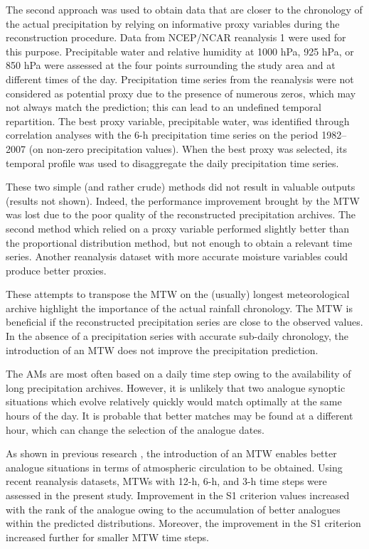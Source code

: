 \documentclass[hess, manuscript]{copernicus}
\begin{document}
	The second approach was used to obtain data that are closer to the chronology of the actual precipitation by relying on informative proxy variables during the reconstruction procedure. Data from NCEP/NCAR reanalysis 1 were used for this purpose. Precipitable water and relative humidity at 1000 hPa, 925 hPa, or 850 hPa were assessed at the four points surrounding the study area and at different times of the day. Precipitation time series from the reanalysis were not considered as potential proxy due to the presence of numerous zeros, which may not always match the prediction; this can lead to an undefined temporal repartition. The best proxy variable, precipitable water, was identified through correlation analyses with the 6-h precipitation time series on the period 1982--2007 (on non-zero precipitation values). When the best proxy was selected, its temporal profile was used to disaggregate the daily precipitation time series.
	
	These two simple (and rather crude) methods did not result in valuable outputs (results not shown). Indeed, the performance improvement brought by the MTW was lost due to the poor quality of the reconstructed precipitation archives. The second method which relied on a proxy variable performed slightly better than the proportional distribution method, but not enough to obtain a relevant time series. Another reanalysis dataset with more accurate moisture variables could produce better proxies.
	
	These attempts to transpose the MTW on the (usually) longest meteorological archive highlight the importance of the actual rainfall chronology. The MTW is beneficial if the reconstructed precipitation series are close to the observed values. In the absence of a precipitation series with accurate sub-daily chronology, the introduction of an MTW does not improve the precipitation prediction.
	
	
	\conclusions  %
	\label{sec:conclusions}
	
	The AMs are most often based on a daily time step owing to the availability of long precipitation archives. However, it is unlikely that two analogue synoptic situations which evolve relatively quickly would match optimally at the same hours of the day. It is probable that better matches may be found at a different hour, which can change the selection of the analogue dates.
	
	As shown in previous research \citep{Finet2008}, the introduction of an MTW enables better analogue situations in terms of atmospheric circulation to be obtained. Using recent reanalysis datasets, MTWs with 12-h, 6-h, and 3-h time steps were assessed in the present study. Improvement in the S1 criterion values increased with the rank of the analogue owing to the accumulation of better analogues within the predicted distributions. Moreover, the improvement in the S1 criterion increased further for smaller MTW time steps.
	
\end{document}
